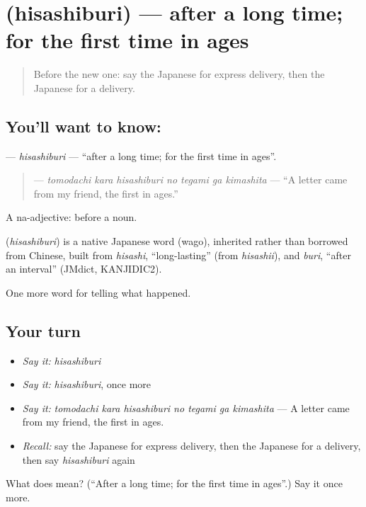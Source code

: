 \section[\texorpdfstring{\ja{ひさしぶり} (hisashiburi)}{ひさしぶり (hisashiburi)}]{ (hisashiburi) — after a long time; for the first time in ages}

\label{lesson:JA-C305-hisashiburi}



\begin{quote}
Before the new one: say the Japanese for express delivery, then the Japanese for a delivery.
\end{quote}

\subsection*{You'll want to know: }
\textbf{} — \emph{hisashiburi} — \textquotedblleft{}after a long time; for the first time in ages\textquotedblright{}.

\begin{quote}
\textbf{   } — \emph{tomodachi kara hisashiburi no tegami ga kimashita} — \textquotedblleft{}A letter came from my friend, the first in ages.\textquotedblright{}
\end{quote}

A na-adjective:  before a noun.

\begin{cousinweb}
\textbf{} (\emph{hisashiburi}) is a native Japanese word (wago), inherited rather than borrowed from Chinese, built from \emph{hisashi}, \textquotedblleft{}long-lasting\textquotedblright{} (from \emph{hisashii}), and \emph{buri}, \textquotedblleft{}after an interval\textquotedblright{} (JMdict, KANJIDIC2).
\end{cousinweb}

\begin{grammarlens}[title={What you've built}]
One more word for telling what happened.
\end{grammarlens}

\subsection*{Your turn}
\begin{itemize}
\raggedright
  \item \emph{Say it:} \emph{hisashiburi}
  \item \emph{Say it:} \emph{hisashiburi}, once more
  \item \emph{Say it:} \emph{tomodachi kara hisashiburi no tegami ga kimashita} — A letter came from my friend, the first in ages.
  \item \emph{Recall:} say the Japanese for express delivery, then the Japanese for a delivery, then say \emph{hisashiburi} again
\end{itemize}

\begin{tcolorbox}[breakable,colback=teal!4,colframe=teal!35!black,title={Before you move on}]
What does  mean? (\textquotedblleft{}After a long time; for the first time in ages\textquotedblright{}.) Say it once more.
\end{tcolorbox}
